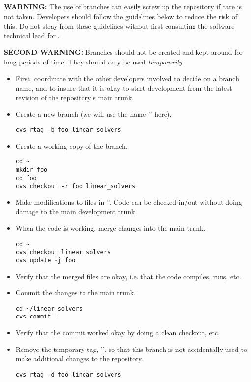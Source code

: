 {\bf WARNING:} The use of branches can easily screw up the repository
if care is not taken.  Developers should follow the guidelines below
to reduce the risk of this.  Do not stray from these guidelines
without first consulting the software technical lead for \hypre{}.

{\bf SECOND WARNING:} Branches should not be created and kept around
for long periods of time.  They should only be used {\em temporarily}.

\begin{itemize}

\item First, coordinate with the other developers involved to decide
on a branch name, and to insure that it is okay to start development
from the latest revision of the repository's main trunk.

\item Create a new branch (we will use the name '' here).
\begin{verbatim}
cvs rtag -b foo linear_solvers
\end{verbatim}

\item Create a working copy of the branch.
\begin{verbatim}
cd ~
mkdir foo
cd foo
cvs checkout -r foo linear_solvers
\end{verbatim}

\item Make modifications to files in ''.
Code can be checked in/out without doing damage to the main
development trunk.

\item When the code is working, merge changes into the main trunk.
\begin{verbatim}
cd ~
cvs checkout linear_solvers
cvs update -j foo
\end{verbatim}

\item Verify that the merged files are okay, i.e. that the code compiles,
runs, etc.

\item Commit the changes to the main trunk.
\begin{verbatim}
cd ~/linear_solvers
cvs commit .
\end{verbatim}

\item Verify that the commit worked okay by doing a clean checkout, etc.

\item Remove the temporary tag, '', so that this branch is
not accidentally used to make additional changes to the repository.
\begin{verbatim}
cvs rtag -d foo linear_solvers
\end{verbatim}

\end{itemize}

